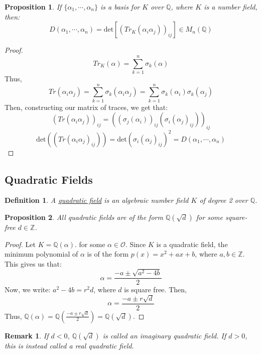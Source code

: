 \documentclass{article}
\newcommand{\Q}{\mathbb{Q}}
\newcommand{\Z}{\mathbb{Z}}
\newtheorem{remark}{Remark}
\newtheorem{proposition}{Proposition}
\newtheorem{definition}{Definition}
\begin{document}
\begin{proposition}
If $\{\alpha_1,\cdots, \alpha_n\}$ is a basis for $K$ over $\Q$, where $K$ is a number field, then:
$$D(\alpha_1,\cdots, \alpha_n)=\text{det}[(Tr_K(\alpha_i\alpha_j))_{ij}]\in M_n(\Q)$$
\end{proposition}
\begin{proof}
$$Tr_K(\alpha)=\sum_{k=1}^n\sigma_k(\alpha)$$
Thus,
$$Tr(\alpha_i\alpha_j)=\sum_{k=1}^n\sigma_k(\alpha_i\alpha_j)=\sum_{k=1}^n\sigma_k(\alpha_i)\sigma_k(\alpha_j)$$
Then, constructing our matrix of traces, we get that:
$$(Tr(\alpha_i\alpha_j))_{ij}=((\sigma_j(\alpha_i))_{ij}(\sigma_i(\alpha_j)_{ij}))_{ij}$$
$$\text{det}((Tr(\alpha_i\alpha_j)_{ij}))= \text{det}(\sigma_i(\alpha_j)_{ij})^2 = D(\alpha_1,\cdots, \alpha_n)$$
\end{proof}
\newpage
\subsection{Quadratic Fields}
\begin{definition}
A \underline{quadratic field} is an algebraic number field $K$ of degree 2 over $\Q$.
\end{definition}
\begin{proposition}
All quadratic fields are of the form $\Q(\sqrt{d})$ for some square-free $d\in\Z$. 
\end{proposition}
\begin{proof}
Let $K=\Q(\alpha)$. for some $\alpha\in\mathcal{O}$. Since $K$ is a quadratic field, the minimum polynomial of $\alpha$ is of the form $p(x)=x^2+ax+b$, where $a,b\in\Z$. This gives us that:
$$\alpha = \frac{-a\pm \sqrt{a^2-4b}}{2}$$
Now, we write: $a^2-4b= r^2d$, where $d$ is square free. Then, 
$$\alpha = \frac{-a\pm r\sqrt{d}}{2}$$
Thus, $\Q(\alpha)=\Q\left(\frac{-a\pm r\sqrt{d}}{2}\right)=\Q(\sqrt{d})$.
\end{proof}
\begin{remark}
If $d<0$, $\Q(\sqrt{d})$ is called an imaginary quadratic field. If $d>0$, this is instead called a real quadratic field. 
\end{remark}
\end{document}
